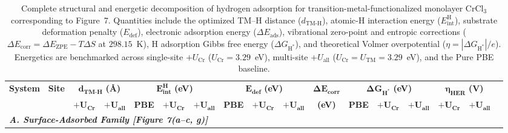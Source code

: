 \begin{table}[htbp]
  \centering
  \small
  \caption{Complete structural and energetic decomposition of hydrogen adsorption for transition-metal-functionalized monolayer $\text{CrCl}_3$ corresponding to Figure~7. Quantities include the optimized TM--H distance ($d_{\text{TM-H}}$), atomic-H interaction energy ($E_{\text{int}}^{\text{H}}$), substrate deformation penalty ($E_{\text{def}}$), electronic adsorption energy ($\Delta E_{\text{ads}}$), vibrational zero-point and entropic corrections ($\Delta E_{\text{corr}} = \Delta E_{\text{ZPE}} - T\Delta S$ at $298.15$~K), H adsorption Gibbs free energy ($\Delta G_{\text{H}^*}$), and theoretical Volmer overpotential ($\eta = |\Delta G_{\text{H}^*}|/e$). Energetics are benchmarked across single-site $+U_{\text{Cr}}$ ($U_{\text{Cr}} = 3.29$~eV), multi-site $+U_{\text{all}}$ ($U_{\text{Cr}} = U_{\text{TM}} = 3.29$~eV), and the Pure PBE baseline.}
  \label{tab:fig7_energies_complete}
  \vspace{0.25cm}
  \begin{adjustbox}{max width=\textwidth}
    \begin{tabular}{llccccccccccccccc}
      \toprule
      \textbf{System} & \textbf{Site} & \multicolumn{2}{c}{$\boldsymbol{d_{\text{TM-H}}}$ \textbf{(\AA)}} & \multicolumn{3}{c}{$\boldsymbol{E_{\text{int}}^{\text{H}}}$ \textbf{(eV)}} & \multicolumn{3}{c}{$\boldsymbol{E_{\text{def}}}$ \textbf{(eV)}} & $\boldsymbol{\Delta E_{\text{corr}}}$ & \multicolumn{3}{c}{$\boldsymbol{\Delta G_{\text{H}^*}}$ \textbf{(eV)}} & \multicolumn{2}{c}{$\boldsymbol{\eta_{\text{HER}}}$ \textbf{(V)}} \\
      \cmidrule(lr){3-4} \cmidrule(lr){5-7} \cmidrule(lr){8-10} \cmidrule(lr){12-14} \cmidrule(lr){15-16}
      & & $\boldsymbol{+U_{\text{Cr}}}$ & $\boldsymbol{+U_{\text{all}}}$ & \textbf{PBE} & $\boldsymbol{+U_{\text{Cr}}}$ & $\boldsymbol{+U_{\text{all}}}$ & \textbf{PBE} & $\boldsymbol{+U_{\text{Cr}}}$ & $\boldsymbol{+U_{\text{all}}}$ & \textbf{(eV)} & \textbf{PBE} & $\boldsymbol{+U_{\text{Cr}}}$ & $\boldsymbol{+U_{\text{all}}}$ & $\boldsymbol{+U_{\text{Cr}}}$ & $\boldsymbol{+U_{\text{all}}}$ \\
      \midrule
      \multicolumn{16}{l}{\textit{\textbf{A. Surface-Adsorbed Family [Figure 7(a--c, g)]}}} \\

\end{tabular}
\end{adjustbox}
\end{table}
